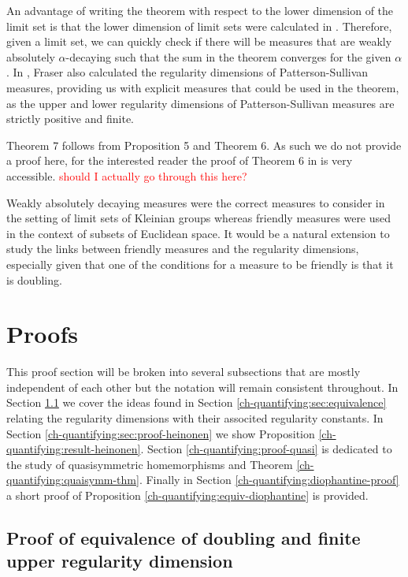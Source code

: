 An advantage of writing the theorem with respect to the lower dimension of the limit set is that the lower dimension of limit sets were calculated in \cite{fraser2}. Therefore, given a limit set, we can quickly check if there will be measures that are weakly absolutely $\alpha$-decaying such that the sum in the theorem converges for the given $\alpha$. In \cite{fraser2}, Fraser also calculated the regularity dimensions of Patterson-Sullivan measures, providing us with explicit measures that could be used in the theorem, as the upper and lower regularity dimensions of Patterson-Sullivan measures are strictly positive and finite. 

Theorem 7 follows from Proposition 5 and Theorem 6. As such we do not provide a proof here, for the interested reader the proof of Theorem 6 in \cite{beres-sanju-al} is very accessible.
\textcolor{red}{should I actually go through this here?}

Weakly absolutely decaying measures were the correct measures to consider in the setting of limit sets of Kleinian groups whereas friendly measures were used in the context of subsets of Euclidean space. It would be a natural extension to study the links between friendly measures and the regularity dimensions, especially given that one of the conditions for a measure to be friendly is that it is doubling.  



\section{Proofs}


This proof section will be broken into several subsections that are mostly independent of each other but the notation will remain consistent throughout. In Section \ref{ch-upper-reg:doublingproof} we cover the ideas found in Section \ref{ch-quantifying:sec:equivalence} relating the regularity dimensions with their associted regularity constants. In Section \ref{ch-quantifying:sec:proof-heinonen} we show Proposition \ref{ch-quantifying:result-heinonen}. Section \ref{ch-quantifying:proof-quasi} is dedicated to the study of quasisymmetric homemorphisms and Theorem \ref{ch-quantifying:quaisymm-thm}. Finally in Section \ref{ch-quantifying:diophantine-proof} a short proof of Proposition \ref{ch-quantifying:equiv-diophantine} is provided.


\subsection{Proof of equivalence of doubling and finite upper regularity dimension} \label{ch-upper-reg:doublingproof}


